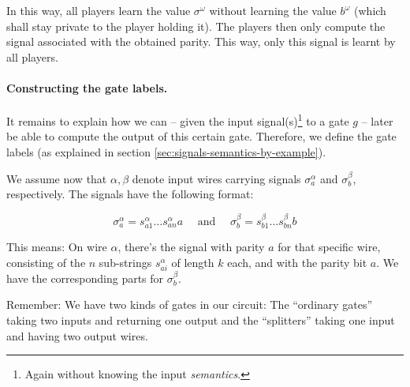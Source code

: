 \message{ !name(seminar.tex)}\documentclass{llncs}
\begin{document}
In this way, all players learn the value $\sigma^\omega$ without learning the value $b^\omega$ (which shall stay private to the player holding it). The players then only compute the signal associated with the obtained parity. This way, only this signal is learnt by all players.

\paragraph{Constructing the gate labels.}

It remains to explain how we can -- given the input signal(s)\footnote{Again without knowing the input \emph{semantics}.} to a gate $g$ -- later be able to compute the output of this certain gate. Therefore, we define the gate labels (as explained in section \ref{sec:signals-semantics-by-example}). 

We assume now that $\alpha, \beta$ denote input wires carrying signals $\sigma^\alpha_a$ and $\sigma^\beta_b$, respectively. The signals have the following format:

\begin{equation*}
  \sigma^\alpha_a=s_{a1}^\alpha\dots s_{an}^\alpha a  \quad \text{ and }\quad \sigma^\beta_b=s_{b1}^\beta\dots s_{bn}^\beta b
\end{equation*}

This means: On wire $\alpha$, there's the signal with parity $a$ for that specific wire, consisting of the $n$ sub-strings $s_{ai}^\alpha$ of length $k$ each, and with the parity bit $a$. We have the corresponding parts for $\sigma_b^\beta$.

Remember: We have two kinds of gates in our circuit: The ``ordinary gates'' taking two inputs and returning one output and the ``splitters'' taking one input and having two output wires.
\end{document}
